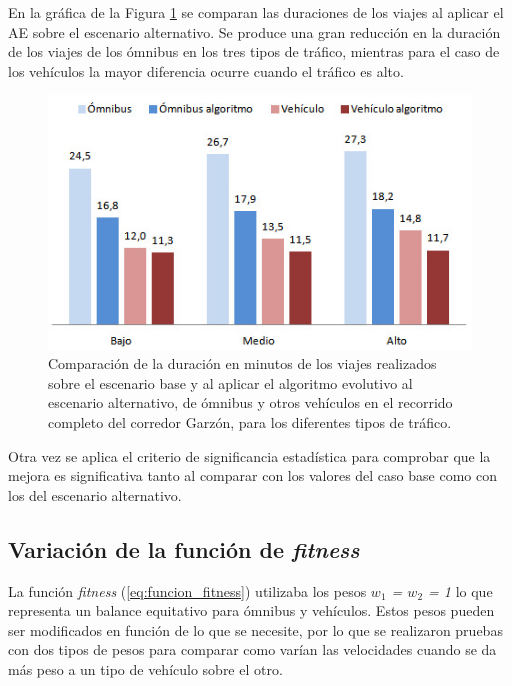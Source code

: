 En la gráfica de la Figura \ref{fig:duracion_viajes_alernativo} se comparan las duraciones de los viajes al aplicar el AE sobre el escenario alternativo. Se produce una gran reducción en la duración de los viajes de los ómnibus en los tres tipos de tráfico, mientras para el caso de los vehículos la mayor diferencia ocurre cuando el tráfico es alto.

\begin{figure}[H]
	\centering
	\includegraphics[width=0.8\linewidth]{Figures/duracio_viajes_alternativo}
	\caption[Comparación de la duración de los viajes en minutos entre el escenario base y el algoritmo evolutivo sobre el escenario alternativo.]{Comparación de la duración en minutos de los viajes realizados sobre el escenario base y al aplicar el algoritmo evolutivo  al escenario alternativo, de ómnibus y otros vehículos en el recorrido completo del corredor Garzón, para los diferentes tipos de tráfico.}
	\label{fig:duracion_viajes_alernativo}
\end{figure}

Otra vez se aplica el criterio de significancia estadística para comprobar que la mejora es significativa tanto al comparar con los valores del caso base como con los del escenario alternativo.

\subsection{Variación de la función de \emph{fitness}}

La función \emph{fitness} (\ref{eq:funcion_fitness}) utilizaba los pesos \emph{$w_1$ = $w_2$ = 1} lo que representa un balance equitativo para ómnibus y vehículos. Estos pesos pueden ser modificados en función de lo que se necesite, por lo que se realizaron pruebas con dos tipos de pesos para comparar como varían las velocidades cuando se da más peso a un tipo de vehículo sobre el otro.

